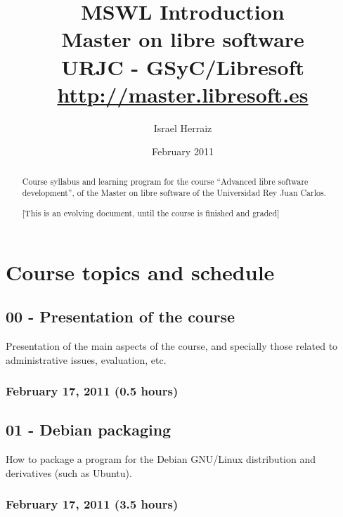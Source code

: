 \documentclass[a4paper]{article}
\title{MSWL Introduction \\
Master on libre software \\
URJC - GSyC/Libresoft \\
\url{http://master.libresoft.es}}
\author{Israel Herraiz}
\date{February 2011}
\begin{document}
\maketitle

\begin{abstract}
Course syllabus and learning program for the course ``Advanced libre
software development'', of the Master on libre software of the
Universidad Rey Juan Carlos.

[This is an evolving document, until the course is finished and graded]
\end{abstract}

\tableofcontents

\section{Course topics and schedule}

\subsection{00 - Presentation of the course}

Presentation of the main aspects of the course, and specially those
related to administrative issues, evaluation, etc.

\subsubsection{February 17, 2011 (0.5 hours)}

\subsection{01 - Debian packaging}

How to package a program for the Debian GNU/Linux distribution and
derivatives (such as Ubuntu).

\subsubsection{February 17, 2011 (3.5 hours)}
\end{document}
